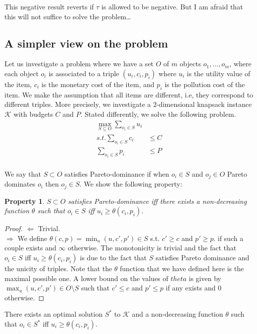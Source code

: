 \documentclass[version=3.21, pagesize, twoside=off, bibliography=totoc, DIV=calc, fontsize=12pt, a4paper, french, english]{scrartcl}
\newtheorem{property}{Property}
\begin{document}
This negative result reverts if $τ$ is allowed to be negative. But I am afraid that this will not suffice to solve the problem…

\subsection{A simpler view on the problem}
Let us investigate a problem where we have a set $O$ of $m$ objects $o_1, \ldots, o_m$, where each object $o_i$ is associated to a triple $(u_i, c_i, p_i)$ where $u_i$ is the utility value of the item, $c_i$ is the monetary cost of the item, and $p_i$ is the pollution cost of the item. 
We make the assumption that all items are different, i.e, they correspond to different triples. 
More precisely, we investigate a $2$-dimensional knapsack instance $\mathcal{K}$ with budgets $C$ and $P$. 
Stated differently, we solve the following problem.
\begin{align}
\max_{S\subseteq O} \sum_{o_i \in S} u_i&\\
s.t.  \sum_{o_i \in S} c_i &\le C\\
 \sum_{o_i \in S} p_i &\le P\\
\end{align}

We say that $S\subset O$ satisfies Pareto-dominance if when $o_i \in S$ and $o_j \in O$ Pareto dominates $o_i$ then $o_j \in S$.
We show the following property: 
\begin{property}
$S\subset O$ satisfies Pareto-dominance iff there exists a non-decreasing function $\theta$ such that $o_i\in S$ iff $u_i \ge \theta(c_i,p_i)$.
\end{property}
\begin{proof}
$\Leftarrow$ Trivial.\\
$\Rightarrow$ We define $\theta(c,p) = \min_{u} (u,c',p')\in S$ s.t. $c'\ge c$ and $p'\ge p$. if such a couple exists and $\infty$ otherwise. The monotonicity is trivial and the fact that $o_i\in S$ iff $u_i \ge \theta(c_i,p_i)$ is due to the fact that $S$ satisfies Pareto dominance and the unicity of triples. Note that the $\theta$ function that we have defined here is the maximal possible one. A lower bound on the values of $theta$ is given by $\max_u (u,c',p')\in O\setminus S$ such that $c'\le c$ and $p'\le p$ if any exists and $0$ otherwise.  
\end{proof}

\begin{corollary}
There exists an optimal solution $S^*$ to $\mathcal{K}$ and a non-decreasing function $\theta$ such that $o_i\in S^*$ iff $u_i \ge \theta(c_i,p_i)$.
\end{corollary}
\end{document}
